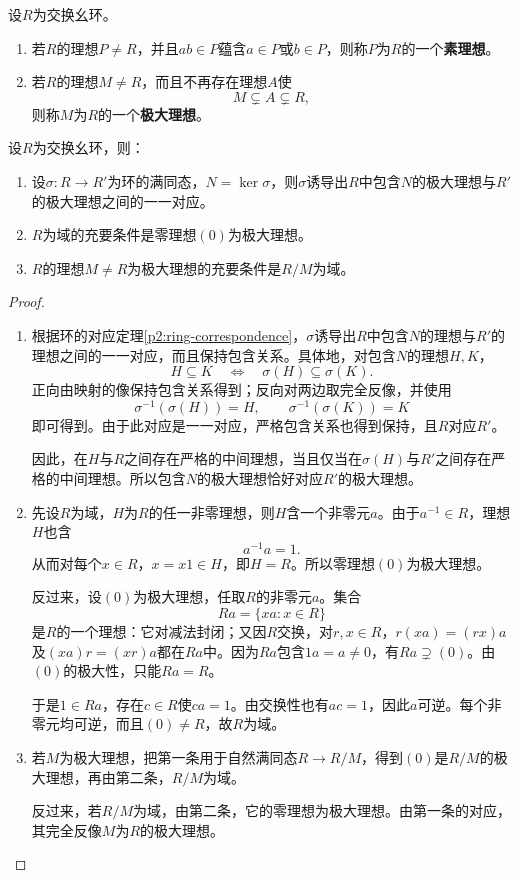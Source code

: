 \begin{definition}
设$R$为交换幺环。
\begin{enumerate}
\item 若$R$的理想$P\ne R$，并且$ab\in P$蕴含$a\in P$或$b\in P$，则称$P$为$R$的一个\textbf{素理想}。
\item 若$R$的理想$M\ne R$，而且不再存在理想$A$使
\[
M\subsetneq A\subsetneq R,
\]
则称$M$为$R$的一个\textbf{极大理想}。
\end{enumerate}
\end{definition}


\begin{theorem}\label{p2:prime-maximal}
设$R$为交换幺环，则：
\begin{enumerate}
\item 设$\sigma:R\to R'$为环的满同态，$N=\ker\sigma$，则$\sigma$诱导出$R$中包含$N$的极大理想与$R'$的极大理想之间的一一对应。
\item $R$为域的充要条件是零理想$(0)$为极大理想。
\item $R$的理想$M\ne R$为极大理想的充要条件是$R/M$为域。
\end{enumerate}
\end{theorem}
\begin{proof}
	\begin{enumerate}
		\item 根据环的对应定理\ref{p2:ring-correspondence}，$\sigma$诱导出$R$中包含$N$的理想与$R'$的理想之间的一一对应，而且保持包含关系。具体地，对包含$N$的理想$H,K$，
		\[
		H\subseteq K\quad\Longleftrightarrow\quad\sigma(H)\subseteq\sigma(K).
		\]
		正向由映射的像保持包含关系得到；反向对两边取完全反像，并使用
		\[
		\sigma^{-1}(\sigma(H))=H,\qquad
		\sigma^{-1}(\sigma(K))=K
		\]
		即可得到。由于此对应是一一对应，严格包含关系也得到保持，且$R$对应$R'$。
		
		因此，在$H$与$R$之间存在严格的中间理想，当且仅当在$\sigma(H)$与$R'$之间存在严格的中间理想。所以包含$N$的极大理想恰好对应$R'$的极大理想。
		\item 先设$R$为域，$H$为$R$的任一非零理想，则$H$含一个非零元$a$。由于$a^{-1}\in R$，理想$H$也含
		\[
		a^{-1}a=1.
		\]
		从而对每个$x\in R$，$x=x1\in H$，即$H=R$。所以零理想$(0)$为极大理想。
		
		反过来，设$(0)$为极大理想，任取$R$的非零元$a$。集合
		\[
		Ra=\{xa:x\in R\}
		\]
		是$R$的一个理想：它对减法封闭；又因$R$交换，对$r,x\in R$，$r(xa)=(rx)a$及$(xa)r=(xr)a$都在$Ra$中。因为$Ra$包含$1a=a\ne0$，有$Ra\supsetneq(0)$。由$(0)$的极大性，只能$Ra=R$。
		
		于是$1\in Ra$，存在$c\in R$使$ca=1$。由交换性也有$ac=1$，因此$a$可逆。每个非零元均可逆，而且$(0)\ne R$，故$R$为域。
		\item 若$M$为极大理想，把第一条用于自然满同态$R\to R/M$，得到$(0)$是$R/M$的极大理想，再由第二条，$R/M$为域。
		
		反过来，若$R/M$为域，由第二条，它的零理想为极大理想。由第一条的对应，其完全反像$M$为$R$的极大理想。
	\end{enumerate}
\end{proof}


